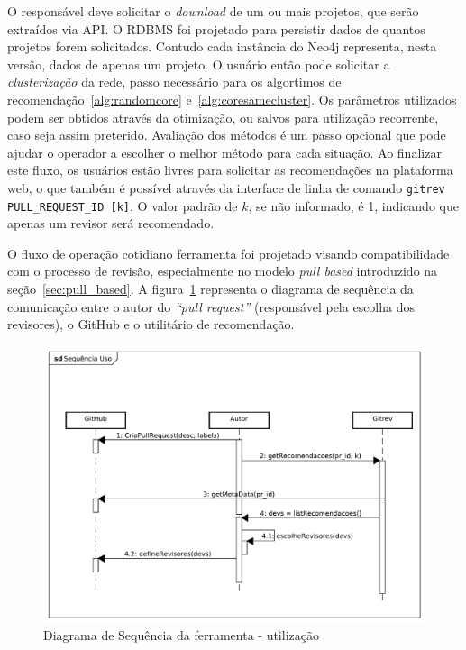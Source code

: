 \documentclass[12pt,openany,oneside,a4paper,english,brazil]{abntbibufjf}
\newcommand{\inlinecode}{\texttt}
\begin{document}
   O responsável deve solicitar o \textit{download} de um ou mais projetos, que serão extraídos via API. O RDBMS foi projetado para persistir dados de quantos projetos forem solicitados. Contudo cada instância do Neo4j representa, nesta versão, dados de apenas um projeto. O usuário então pode solicitar a \textit{clusterização} da rede, passo necessário para os algortimos de recomendação~\ref{alg:randomcore} e~\ref{alg:coresamecluster}. Os parâmetros utilizados podem ser obtidos através da otimização, ou salvos para utilização recorrente, caso seja assim preterido. Avaliação dos métodos é um passo opcional que pode ajudar o operador a escolher o melhor método para cada situação. Ao finalizar este fluxo, os usuários estão livres para solicitar as recomendações na plataforma web, o que também é possível através da interface de linha de comando \inlinecode{gitrev PULL\_REQUEST\_ID [k]}. O valor padrão de $k$, se não informado, é 1, indicando que apenas um revisor será recomendado.

   O fluxo de operação cotidiano ferramenta foi projetado visando compatibilidade com o processo de revisão, especialmente no modelo \textit{pull based} \cite{gousios2014} introduzido na seção~\ref{sec:pull_based}. A figura~\ref{fig:sequencia} representa o diagrama de sequência da comunicação entre o autor do \textit{``pull request''} (responsável pela escolha dos revisores), o GitHub e o utilitário de recomendação.

   \begin{figure}[!htbp]
    \includegraphics[width=\textwidth]{sequencia}
    \caption{Diagrama de Sequência da ferramenta - utilização}\label{fig:sequencia}
  \end{figure}
\end{document}
